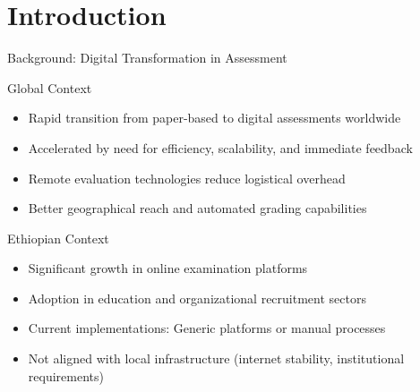 \section{Introduction}

\begin{frame}{Background: Digital Transformation in Assessment}
    \begin{block}{Global Context}
        \begin{itemize}
            \item Rapid transition from paper-based to digital assessments worldwide
            \item Accelerated by need for efficiency, scalability, and immediate feedback
            \item Remote evaluation technologies reduce logistical overhead
            \item Better geographical reach and automated grading capabilities
        \end{itemize}
    \end{block}
    
    \begin{block}{Ethiopian Context}
        \begin{itemize}
            \item Significant growth in online examination platforms
            \item Adoption in education and organizational recruitment sectors
            \item Current implementations: Generic platforms or manual processes
            \item Not aligned with local infrastructure (internet stability, institutional requirements)
        \end{itemize}
    \end{block}
\end{frame}

